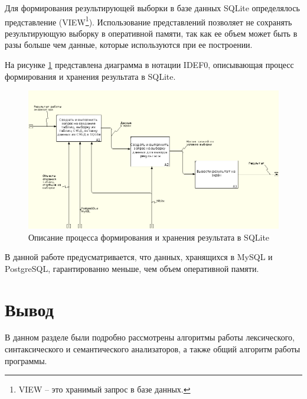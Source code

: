 Для формирования результирующей выборки в базе данных SQLite определялось представление (VIEW\footnote{VIEW – это хранимый запрос в базе данных.}). Использование представлений позволяет не сохранять результирующую выборку в оперативной памяти, так как ее объем может быть в разы больше чем данные, которые используются при ее построении.

На рисунке \ref{img:idef0_3_res} представлена диаграмма в нотации IDEF0, описывающая процесс формирования и хранения результата в SQLite.

\begin{figure}[h!]
	\begin{center}
		\includegraphics[scale=0.68]{./inc/img/idef0_3_res}
		\caption{Описание процесса формирования и хранения результата в SQLite}
		\label{img:idef0_3_res}
	\end{center}
\end{figure}

В данной работе предусматривается, что данных, хранящихся в MySQL и PostgreSQL, гарантированно меньше, чем объем оперативной памяти.


\section{Вывод}


В данном разделе были подробно рассмотрены алгоритмы работы лексического, синтаксического и семантического анализаторов, а также общий алгоритм работы программы.